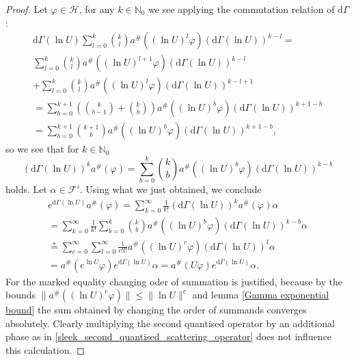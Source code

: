 \documentclass[b5paper,draft,openbib,12pt]{memoir}
\begin{document}
\begin{proof}
Let \(\varphi\in \mathcal{H}\), for any \(k\in \mathbb{N}_0\) we see applying the commutation relation of \(\mathrm{d}\Gamma\):
\begin{multline*}
\mathrm{d}\Gamma(\ln U) \sum_{l=0}^k \binom{k}{l} a^\# \left(\left(\ln U\right)^l \varphi \right) \left(\mathrm{d}\Gamma(\ln U)\right)^{k-l} = \\
\sum_{l=0}^k \binom{k}{l} a^\# \left(\left(\ln U\right)^{l+1} \varphi \right) \left(\mathrm{d}\Gamma(\ln U)\right)^{k-l}\\
+\sum_{l=0}^k \binom{k}{l} a^\# \left(\left(\ln U\right)^l \varphi \right) \left(\mathrm{d}\Gamma(\ln U)\right)^{k-l+1}\\
= \sum_{b=0}^{k+1} \left( \binom{k}{b-1} + \binom{k}{b}\right) a^\#\left( (\ln U)^b \varphi\right) \left( \mathrm{d}\Gamma(\ln U)\right)^{k+1-b}\\
=\sum_{b=0}^{k+1}  \binom{k+1}{b}  a^\#\left( (\ln U)^b \varphi\right) \left( \mathrm{d}\Gamma(\ln U)\right)^{k+1-b},
\end{multline*}
so we see that for \(k\in\mathbb{N}_0\)
\begin{equation}
\left(\mathrm{d}\Gamma(\ln U)\right)^k a^\# (\varphi) = \sum_{b=0}^{k}  \binom{k}{b}  a^\#\left( (\ln U)^b \varphi\right) \left( \mathrm{d}\Gamma(\ln U)\right)^{k-b}
\end{equation}
holds. Let \(\alpha \in \mathcal{F}'\). Using what we just obtained, we conclude
\begin{multline*}
e^{\mathrm{d}\Gamma(\ln U)}a^\#(\varphi) = \sum_{k=0}^\infty \frac{1}{k!} \left(\mathrm{d}\Gamma(\ln U)\right)^k a^\# (\varphi)\alpha\\
=\sum_{k=0}^\infty \frac{1}{k!}  \sum_{b=0}^{k}  \binom{k}{b}  a^\#\left( (\ln U)^b \varphi \right) \left( \mathrm{d}\Gamma(\ln U)\right)^{k-b}\alpha\\
\overset{*}{=}\sum_{c=0}^\infty \sum_{l=0}^\infty \frac{1}{c! l!} a^\#\left( (\ln U)^c \varphi \right) \left( \mathrm{d}\Gamma(\ln U)\right)^{l}\alpha\\
=a^\#\left( e^{\ln U} \varphi \right) e^{\mathrm{d}\Gamma( \ln U)}\alpha
=a^\#\left( U \varphi \right) e^{\mathrm{d}\Gamma( \ln U)}\alpha.
\end{multline*}
For the marked equality changing oder of summation is justified, because by the bounds
 \(\|a^\#((\ln U)^c \varphi)\|\le \|\ln U\|^c\) and  lemma \ref{Gamma exponential bound} the sum obtained by changing the order
 of summands converges absolutely.
Clearly multiplying the second quantised operator by an additional phase as in 
\eqref{sleek_second_quantised_scattering_operator} does not influence this calculation.
\end{proof}
\end{document}
